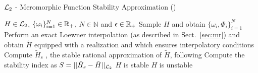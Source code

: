 \documentclass[graybox]{svmult}
\begin{document}
\begin{algorithm}[h]
	\caption{${\mathcal{L}_{2}}$ - Meromorphic Function Stability Approximation (\mfsa) } \label{algo:MFSA} 
	\begin{algorithmic}[1]
		\REQUIRE $H\in{\mathcal{L}_{2}}$, $\{\omega_i\}_{i=1}^N \in \mathbb{R}_+$, $N\in \mathbb N$ and $\epsilon\in\mathbb{R}_+$
		\STATE Sample $H$ and obtain $\{\omega_i, \Phi_i\}_{i=1}^N$
		\STATE Perform an exact Loewner interpolation (as described in Sect.~\ref{sec:mr}) and obtain $\tilde H$ equipped with a realization and which ensures interpolatory conditions
		\STATE Compute $\tilde H_s$ , the stable rational approximation of $\tilde H$, following \cite{Kohler:2014} 
		\STATE Compute the stability index as $S=|| \tilde H_s-\tilde H ||_{{\mathcal{L}_{2}}}$
		\STATE $H$ is stable
		\ELSE
		\STATE $H$ is unstable
		\ENDIF
	\end{algorithmic}
\end{algorithm}

\vspace{-1cm}
\end{document}
